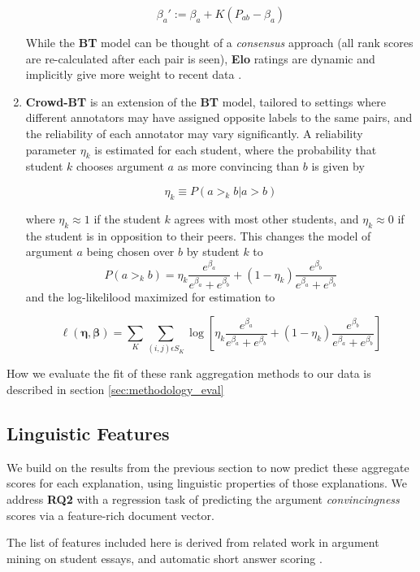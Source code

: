 \documentclass[notitlepage,12pt]{jedm}
\begin{document}
\begin{enumerate}
	$$
	\beta_a':=\beta_a+K(P_{ab} - \beta_a)
	$$
	
	While the \textbf{BT} model can be thought of a \textit{consensus} 
	approach (all rank scores are re-calculated after each pair is seen), 
	\textbf{Elo} ratings are dynamic and implicitly give more weight 
	to recent data \cite{aldous_elo_2017}.
	
	\item \textbf{Crowd-BT} \cite{chen_pairwise_2013} is an extension of the 
	\textbf{BT} model, tailored to settings where different annotators may have 
	assigned opposite labels to the same pairs, and the reliability of each 
	annotator may vary significantly. 
	A reliability parameter $\eta_k$ is estimated for each student, where the 
	probability that student $k$ chooses argument $a$ as more convincing than 
	$b$ is given by 
	
	$$
	\eta_k \equiv P(a >_k b | a >b )
	$$
	
	where $\eta_k \approx 1$ if the student  $k$ agrees with most other 
	students, and $\eta_k \approx 0$ if the student is in opposition to their 
	peers.
	This changes the model of argument $a$ being chosen over $b$ by student $k$ 
	to 
	$$
	P(a >_k b) = 
	\eta_k \frac{e^{\beta_a}}{e^{\beta_a}+e^{\beta_b}} + (1-\eta_k) 
	\frac{e^{\beta_b}}{e^{\beta_a}+e^{\beta_b}}
	$$
	and the log-likelilood maximized for estimation to 
	
	$$
	\ell(\boldsymbol{\eta},\boldsymbol{\beta})=\sum_{K}\sum_{(i,j)\epsilon 
		S_K}^{} 
	\log \left[ \eta_k \frac{e^{\beta_a}}{e^{\beta_a}+e^{\beta_b}} + (1-\eta_k) 
	\frac{e^{\beta_b}}{e^{\beta_a}+e^{\beta_b}} \right]
	$$
	
\end{enumerate}

How we evaluate the fit of these rank aggregation methods to our data is 
described in section \ref{sec:methodology_eval}

\subsection{Linguistic Features}\label{sec:features}
We build on the results from the previous section to now predict these 
aggregate scores for each explanation, using linguistic properties of those 
explanations.
We address \textbf{RQ2} with a regression task of predicting the argument 
\textit{convincingness} scores via a feature-rich document vector.

The list of features included here is derived from related work in argument 
mining \cite{habernal_which_2016,persing_end--end_2016} on student 
essays, and automatic short answer scoring \cite{mohler_text--text_2009}.
\end{document}
